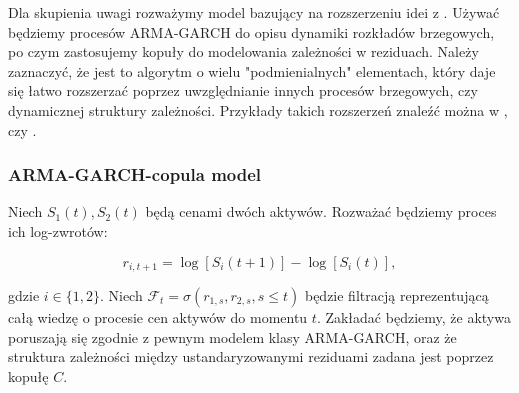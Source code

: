 Dla skupienia uwagi rozważymy model bazujący na rozszerzeniu idei z \cite{Herath_Copula_Crack_Spread}. Używać będziemy procesów ARMA-GARCH do opisu dynamiki rozkładów brzegowych, po czym zastosujemy kopuły do modelowania zależności w reziduach. Należy zaznaczyć, że jest to algorytm o wielu "podmienialnych" elementach, który daje się łatwo rozszerzać poprzez uwzględnianie innych procesów brzegowych, czy dynamicznej struktury zależności. Przykłady takich rozszerzeń znaleźć można w \cite{Espen_Crack_Spread_Copula}, \cite{Bernard_Pricing_Multivariate_Options_with_copulae} czy \cite{Cherubini_Dynamic_Copula_Methods_in_Finance}.\\

\subsubsection{ARMA-GARCH-copula model}
Niech $S_1(t), S_2(t)$ będą cenami dwóch aktywów. Rozważać będziemy proces ich log-zwrotów:

$$ r_{i, t+1} = \log[S_i(t+1)] - \log[S_i(t)],$$

gdzie $i\in\{1,2\}$. Niech $\mathcal{F}_t = \sigma(r_{1,s}, r_{2,s}, s\leqslant t)$ będzie filtracją reprezentującą całą wiedzę o procesie cen aktywów do momentu $t$. Zakładać będziemy, że aktywa poruszają się zgodnie z pewnym modelem klasy ARMA-GARCH, oraz że struktura zależności między ustandaryzowanymi reziduami zadana jest poprzez kopułę $C$.\\